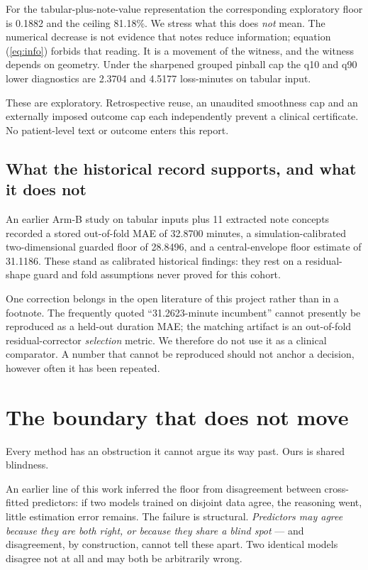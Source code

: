 \documentclass[11pt,a4paper]{article}
\newcommand{\tier}[1]{\textsf{\small#1}}
\begin{document}
For the tabular-plus-note-value representation the corresponding exploratory floor is 0.1882 and the ceiling 81.18\%. We stress what this does \emph{not} mean. The numerical decrease is not evidence that notes reduce information; equation (\ref{eq:info}) forbids that reading. It is a movement of the witness, and the witness depends on geometry. Under the sharpened grouped pinball cap the q10 and q90 lower diagnostics are 2.3704 and 4.5177 loss-minutes on tabular input.

These are \tier{exploratory}. Retrospective reuse, an unaudited smoothness cap and an externally imposed outcome cap each independently prevent a clinical certificate. No patient-level text or outcome enters this report.

\subsection{What the historical record supports, and what it does not}

An earlier Arm-B study on tabular inputs plus 11 extracted note concepts recorded a stored out-of-fold MAE of 32.8700 minutes, a simulation-calibrated two-dimensional guarded floor of 28.8496, and a central-envelope floor estimate of 31.1186. These stand as \tier{calibrated} historical findings: they rest on a residual-shape guard and fold assumptions never proved for this cohort.

One correction belongs in the open literature of this project rather than in a footnote. The frequently quoted ``31.2623-minute incumbent'' cannot presently be reproduced as a held-out duration MAE; the matching artifact is an out-of-fold residual-corrector \emph{selection} metric. We therefore do not use it as a clinical comparator. A number that cannot be reproduced should not anchor a decision, however often it has been repeated.

\section{The boundary that does not move}

Every method has an obstruction it cannot argue its way past. Ours is shared blindness.

An earlier line of this work inferred the floor from disagreement between cross-fitted predictors: if two models trained on disjoint data agree, the reasoning went, little estimation error remains. The failure is structural. \emph{Predictors may agree because they are both right, or because they share a blind spot} --- and disagreement, by construction, cannot tell these apart. Two identical models disagree not at all and may both be arbitrarily wrong.
\end{document}

